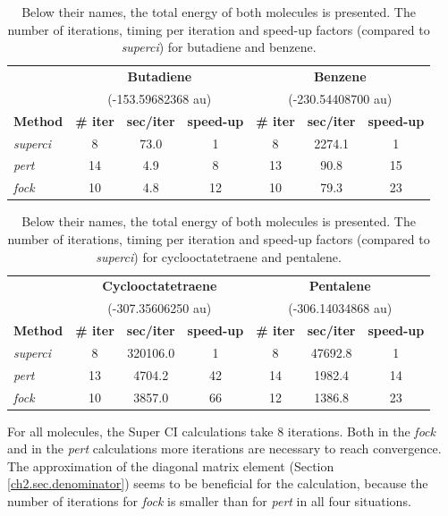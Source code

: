 \begin{table}[htbp]
\caption{Below their names, the total energy of both molecules is presented. The number of iterations, timing per iteration and speed-up factors (compared to \textit{superci}) for butadiene and benzene.}
\begin{center}
\begin{tabular}{l c c c c c c}
\hline
&\multicolumn{3}{c}{\textbf{Butadiene}}&\multicolumn{3}{c}{\textbf{Benzene}}\\
&\multicolumn{3}{c}{(-153.59682368 au)}&\multicolumn{3}{c}{(-230.54408700 au)}\\
\textbf{Method}&\textbf{\# iter}&\textbf{sec/iter}&\textbf{speed-up}&\textbf{\# iter}&\textbf{sec/iter}&\textbf{speed-up}\\
\hline
\textit{superci}&8&73.0&1&8&2274.1&1\\
\textit{pert}&14&4.9&8&13&90.8&15\\
\textit{fock}&10&4.8&12&10&79.3&23\\
\end{tabular}
\label{ch2.tab.flat1}
\end{center}
\end{table}

\begin{table}[htbp]
\caption{Below their names, the total energy of both molecules is presented. The number of iterations, timing per iteration and speed-up factors (compared to \textit{superci}) for cyclooctatetraene and pentalene.}
\begin{center}
\begin{tabular}{l c c c c c c}
\hline
&\multicolumn{3}{c}{\textbf{Cyclooctatetraene}}&\multicolumn{3}{c}{\textbf{Pentalene}}\\
&\multicolumn{3}{c}{(-307.35606250 au)}&\multicolumn{3}{c}{(-306.14034868 au)}\\
\textbf{Method}&\textbf{\# iter}&\textbf{sec/iter}&\textbf{speed-up}&\textbf{\# iter}&\textbf{sec/iter}&\textbf{speed-up}\\
\hline
\textit{superci}&8&320106.0&1&8&47692.8&1\\
\textit{pert}&13&4704.2&42&14&1982.4&14\\
\textit{fock}&10&3857.0&66&12&1386.8&23\\
\end{tabular}
\label{ch2.tab.flat2}
\end{center}
\end{table}

For all molecules, the Super CI calculations take 8 iterations. Both in the \textit{fock} and in the \textit{pert} calculations more iterations are necessary to reach convergence. The approximation of the diagonal matrix element (Section \ref{ch2.sec.denominator}) seems to be beneficial for the calculation, because the number of iterations for \textit{fock} is smaller than for \textit{pert} in all four situations.

